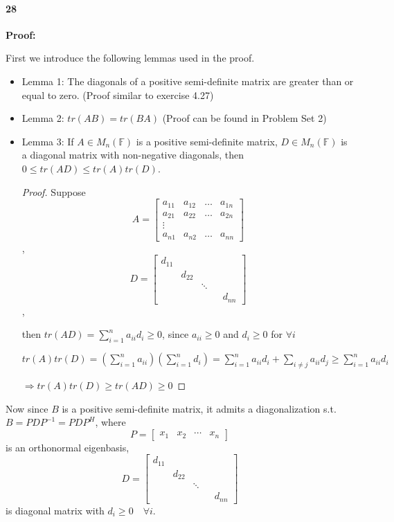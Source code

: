 \documentclass[10pt,letter]{article}
\begin{document}
\paragraph{28}
\textbf{Proof:}

First we introduce the following lemmas used in the proof.

\begin{itemize}
	\item Lemma 1: The diagonals of a positive semi-definite matrix are greater than or equal to zero. (Proof similar to exercise 4.27)
	\item Lemma 2: $tr(AB) = tr(BA)$ (Proof can be found in Problem Set 2)
	\item Lemma 3: If $A \in M_{n}(\mathbb{F})$ is a positive semi-definite matrix, $D \in M_{n}(\mathbb{F})$ is a diagonal matrix with non-negative diagonals, then $0 \leq tr(AD) \leq tr(A)tr(D)$.
	\begin{proof}
		Suppose $$
		A = 
		\begin{bmatrix}
		a_{11} & a_{12} & \dots & a_{1n} \\
		a_{21} & a_{22} & \dots & a_{2n} \\
		\vdots   \\
		a_{n1} & a_{n2} &  \dots & a_{nn} 
		\end{bmatrix}
		$$, $$
		D = 
		\begin{bmatrix}
		d_{11}  \\
		& d_{22} \\
		& & \ddots \\
		& &  & & d_{nn} 
		\end{bmatrix}
		$$,
		
		then $tr(AD) = \sum^{n}_{i=1} a_{ii}d_{i} \geq 0$, since $a_{ii} \geq 0$ and $d_{i} \geq 0$ for $\forall i$ 
		
		$tr(A)tr(D) = (\sum^{n}_{i=1} a_{ii})(\sum^{n}_{i=1} d_{i}) = \sum^{n}_{i=1} a_{ii}d_{i} + \sum_{i \neq j} a_{ii}d_{j} \geq \sum^{n}_{i=1} a_{ii}d_{i} $
		
		$\Rightarrow tr(A)tr(D) \geq tr(AD) \geq 0$
	\end{proof}
\end{itemize}

Now since $B$ is a positive semi-definite matrix, it admits a diagonalization s.t. $B = PDP^{-1}= PDP^{H}$, where $$P = \begin{bmatrix}
x_{1} & x_{2} & \cdots & x_{n}
\end{bmatrix}$$ is an orthonormal eigenbasis,
$$
D = 
\begin{bmatrix}
d_{11}  \\
& d_{22} \\
& & \ddots \\
& &  & & d_{nn} 
\end{bmatrix}
$$ is diagonal matrix with $d_{i} \geq 0 \quad \forall i$.
\end{document}

